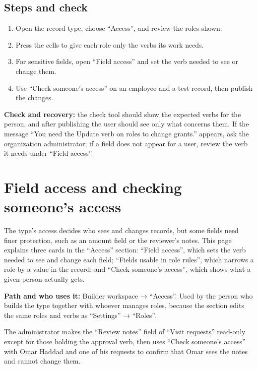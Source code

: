 \subsection{Steps and check}
\begin{enumerate}
\item Open the record type, choose “Access”, and review the roles shown.
\item Press the cells to give each role only the verbs its work needs.
\item For sensitive fields, open “Field access” and set the verb needed to see or change them.
\item Use “Check someone’s access” on an employee and a test record, then publish the changes.
\end{enumerate}

\textbf{Check and recovery:} the check tool should show the expected verbs for the person, and after publishing the user should see only what concerns them. If the message “You need the Update verb on roles to change grants.” appears, ask the organization administrator; if a field does not appear for a user, review the verb it needs under “Field access”.

\clearpage
\section{Field access and checking someone's access}
\label{sec:builder-feature-field-access}

The type's access decides who sees and changes records, but some fields need finer protection, such as an amount field or the reviewer's notes. This page explains three cards in the “Access” section: “Field access”, which sets the verb needed to see and change each field; “Fields usable in role rules”, which narrows a role by a value in the record; and “Check someone's access”, which shows what a given person actually gets.

\textbf{Path and who uses it:} Builder workspace → “Access”. Used by the person who builds the type together with whoever manages roles, because the section edits the same roles and verbs as “Settings” → “Roles”.

\begin{rcnote}
The administrator makes the “Review notes” field of “Visit requests” read-only except for those holding the approval verb, then uses “Check someone's access” with Omar Haddad and one of his requests to confirm that Omar sees the notes and cannot change them.
\end{rcnote}

